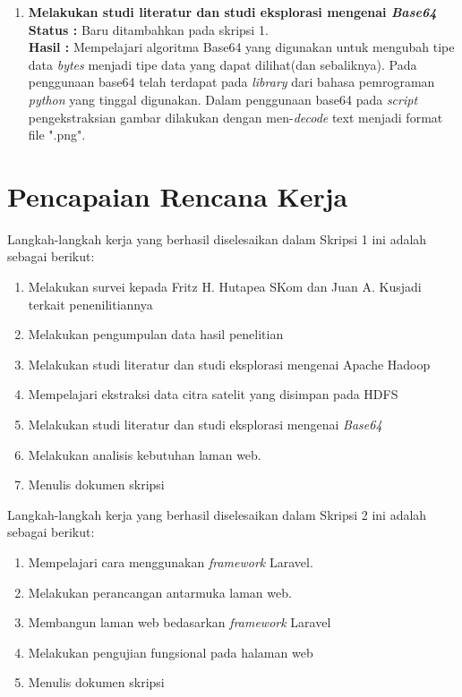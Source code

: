 \documentclass[a4paper,twoside]{article}
\begin{document}
\begin{enumerate}
		\item \textbf{Melakukan studi literatur dan studi eksplorasi mengenai \textit{Base64}}\\
		{\bf Status :} Baru ditambahkan pada skripsi 1.\\
		{\bf Hasil :} Mempelajari algoritma Base64 yang digunakan untuk mengubah tipe data \textit{bytes} menjadi tipe data yang dapat dilihat(dan sebaliknya). Pada penggunaan base64 telah terdapat pada \textit{library} dari bahasa pemrograman \textit{python} yang tinggal digunakan. Dalam penggunaan base64 pada \textit{script} pengekstraksian gambar dilakukan dengan men-\textit{decode} text menjadi format file ".png".
	\end{enumerate}
\newpage

\section{Pencapaian Rencana Kerja}
Langkah-langkah kerja yang berhasil diselesaikan dalam Skripsi 1 ini adalah sebagai berikut:
\begin{enumerate}
	\item Melakukan survei kepada Fritz H. Hutapea SKom dan Juan A. Kusjadi terkait penenilitiannya
	\item Melakukan pengumpulan data hasil penelitian
	\item Melakukan studi literatur dan studi eksplorasi mengenai Apache Hadoop
	\item Mempelajari ekstraksi data citra satelit yang disimpan pada HDFS
	\item Melakukan studi literatur dan studi eksplorasi mengenai \textit{Base64}
	\item Melakukan analisis kebutuhan laman web.
	\item Menulis dokumen skripsi
\end{enumerate}

Langkah-langkah kerja yang berhasil diselesaikan dalam Skripsi 2 ini adalah sebagai berikut:
\begin{enumerate}
	\item Mempelajari cara menggunakan \textit{framework} Laravel.
	\item Melakukan perancangan antarmuka laman web.
	\item Membangun laman web bedasarkan \textit{framework} Laravel
	\item Melakukan pengujian fungsional pada halaman web
	\item Menulis dokumen  skripsi
\end{enumerate}
\end{document}

